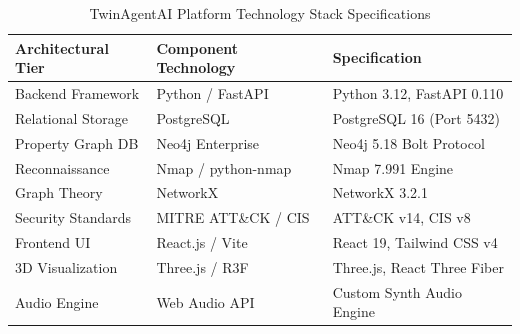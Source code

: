 \documentclass[conference]{IEEEtran}
\begin{document}
\begin{table}[htbp]
\caption{TwinAgentAI Platform Technology Stack Specifications}
\label{tab:tech_stack}
\centering
\begin{tabular}{lll}
\toprule
\textbf{Architectural Tier} & \textbf{Component Technology} & \textbf{Specification} \\
\midrule
Backend Framework & Python / FastAPI & Python 3.12, FastAPI 0.110 \\
Relational Storage & PostgreSQL & PostgreSQL 16 (Port 5432) \\
Property Graph DB & Neo4j Enterprise & Neo4j 5.18 Bolt Protocol \\
Reconnaissance & Nmap / python-nmap & Nmap 7.991 Engine \\
Graph Theory & NetworkX & NetworkX 3.2.1 \\
Security Standards & MITRE ATT\&CK / CIS & ATT\&CK v14, CIS v8 \\
Frontend UI & React.js / Vite & React 19, Tailwind CSS v4 \\
3D Visualization & Three.js / R3F & Three.js, React Three Fiber \\
Audio Engine & Web Audio API & Custom Synth Audio Engine \\
\bottomrule
\end{tabular}
\end{table}
\end{document}
